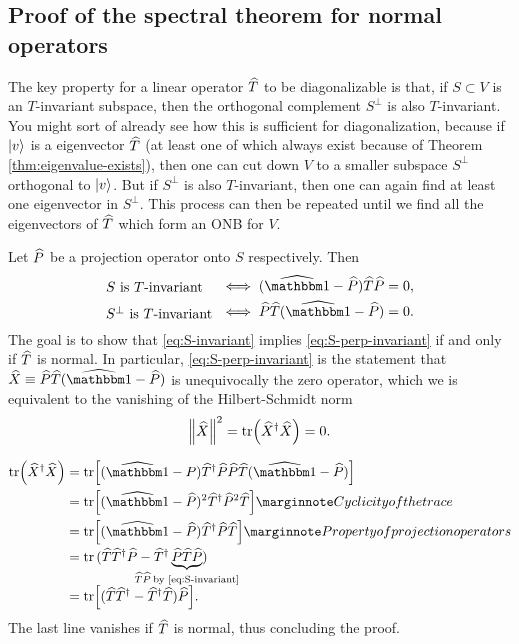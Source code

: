 \subsection{Proof of the spectral theorem for normal operators}\label{sec:spectral-proof}

The key property for a linear operator $\widehat{T}$ to be diagonalizable is that, if $S \subset V$ is an $T$-invariant subspace, then the orthogonal complement $S^{\perp}$ is also $T$-invariant. You might sort of already see how this is sufficient for diagonalization, because if $\ket{v}$ is a eigenvector $\widehat{T}$ (at least one of which always exist because of Theorem \ref{thm:eigenvalue-exists}), then one can cut down $V$ to a smaller subspace $S^{\perp}$ orthogonal to $\ket{v}$. But if $S^{\perp}$ is also $T$-invariant, then one can again find at least one eigenvector in $S^{\perp}$. This process can then be repeated until we find all the eigenvectors of $\widehat{T}$ which form an ONB for $V$.

Let $\widehat{P}$ be a projection operator onto $S$ respectively. Then
\begin{align}
	\parbox{8em}{$S$ is $T$-invariant} &\iff (\op\id - \op P) \op T \op P = 0, \label{eq:S-invariant} \\
	\parbox{8em}{$S^{\perp}$ is $T$-invariant} &\iff \op P \op T (\op\id - \op P)  = 0. \label{eq:S-perp-invariant}
\end{align}
The goal is to show that \eqref{eq:S-invariant} implies \eqref{eq:S-perp-invariant} if and only if $\widehat{T}$ is normal. In particular, \eqref{eq:S-perp-invariant}
 is the statement that $\op X\equiv  \op P \op T (\op\id-\op P) $ is unequivocally the zero operator, which we is equivalent to the vanishing of the Hilbert-Schmidt norm
 \begin{align}
 	\norm{\widehat{X}}^2 = \tr(\widehat{X}^{\dagger} \widehat{X}) = 0.
 \end{align}
 
\begin{align}
	\tr(\op X\dgg \op X) &= \tr[(\op\id - P)\op T\dgg \op P \op P \op T(\op\id -\op P)] \\
	&= \tr[(\op\id -\op P)^2 \op T\dgg \op P^2 \op T] \mnf{Cyclicity of the trace} \\
	&= \tr[(\op\id -\op P) \op T\dgg \op P \op T] \mnf{Property of projection operators} \\
	&= \tr\left(\smash{\op T\op T\dgg \op P - \op T\dgg \underbrace{\op P \op T \op P}_{\mathclap{\op T \op P \textrm{\:by \eqref{eq:S-invariant}}}}}\right) \\[1em]
	&= \tr[(\op T\op T\dgg - \op T\dgg\op T)\op P].
\end{align}
The last line vanishes if $\widehat{T}$ is normal, thus concluding the proof.

